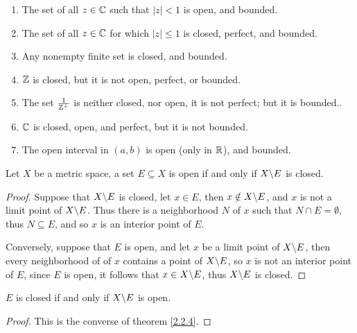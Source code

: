 \begin{example}
    \begin{enumerate}[label=(\arabic*)]
        \item The set of all $z \in \mathbb{C}$ such that $|z|<1$ is open, and bounded.

        \item The set of all $z \in \mathbb{C}$ for which  $|z| \leq 1$ is closed, perfect, and bounded.

        \item Any nonempty finite set is closed, and bounded.

        \item $\mathbb{Z}$ is closed, but it is not open, perfect, or bounded.

        \item The set  $ \frac{1}{\mathbb{Z}^+}$ is neither closed, nor open, it is not perfect; but it 
            is bounded..

        \item $\mathbb{C}$ is closed, open, and perfect, but it is not bounded.

        \item The open interval in  $(a,b)$ is open (only in $\mathbb{R}$), and bounded.
    \end{enumerate}		
\end{example} 

\begin{theorem}\label{2.2.4}
    Let $X$ be a metric space, a set  $E \subseteq X$ is open if and only if  $X \backslash E$ is 
    closed.
\end{theorem}
\begin{proof}
    Suppose that $X \backslash E$ is closed, let  $x \in E$, then  $x \notin X \backslash E$, and $x$ is 
    not a limit point of  $X \backslash E$. Thus there is a neighborhood $N$ of  $x$ such 
    that $N \cap E=\emptyset$, thus $N \subseteq E$, and so $x$ is an interior point of  $E$.

    Conversely, suppose that  $E$ is open, and let  $x$ be a limit point of  $X \backslash E$, 
    then every neighborhood of of  $x$ contains a point of  $X \backslash E$, so  $x$ is not 
    an interior point of  $E$, since  $E$ is open, it follows that  $x \in X \backslash E$, thus 
    $X \backslash E$ is closed.
\end{proof}

\begin{corollary}
    $E$ is closed if and only if  $X \backslash E$ is open.
\end{corollary}
\begin{proof}
    This is the converse of theorem \ref{2.2.4}.		
\end{proof}

